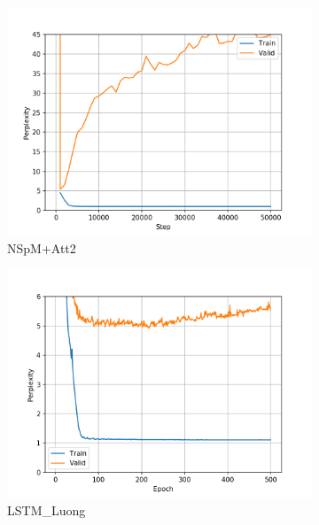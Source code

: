 \begin{figure}[h]
\begin{subfigure}{0.3\textwidth}
\includegraphics[width=\textwidth]{../results/lc-quad1/run1/neural_sparql_machine_luong_attention/ppls.png} 
\caption{NSpM+Att2}
\label{fig:lcquad nsm-luo ppl}
\end{subfigure}
\hfill
\begin{subfigure}{0.3\textwidth}
\includegraphics[width=\textwidth]{../results/lc-quad1/run1/lstm_luong_wmt_en_de/ppls.png}
\caption{LSTM\_Luong}
\label{fig:lcquad lstm ppl}
\end{subfigure}
\hfill
\begin{subfigure}{0.3\textwidth}

\end{subfigure}
\end{figure}
